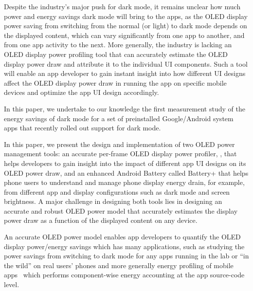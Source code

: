 Despite the industry's major push for dark mode, it remains unclear
how much power and energy savings dark mode will bring to the apps, as
the OLED display power saving from switching from the normal (or
light) to dark mode depends on the displayed content, which can vary
significantly from one app to another, and from one app activity to
the next. More generally, the industry is lacking an OLED display
power profiling tool that can accurately estimate the OLED display
power draw and attribute it to the individual UI components.  Such a
tool will enable an app developer to gain instant insight into how different
UI designs affect the OLED display power draw in running the app on
specific mobile devices and optimize the app UI design accordingly.

In this paper, we undertake to our knowledge the first measurement
study of the energy savings of dark mode for a set of preinstalled Google/Android system
apps that recently rolled out support for dark mode.
\fi

In this paper, we present the design and implementation
of two OLED power management tools:
an accurate per-frame OLED display power profiler, \namee, that helps
developers to gain insight into the impact of different app UI designs
on its OLED power draw, and an enhanced Android Battery called Battery+ that
helps phone users to understand and manage phone
display energy drain, for example, from different app and display
configurations such as dark mode and screen brightness. A major challenge in
designing both tools lies
in designing an accurate and robust
OLED power model that accurately estimates the display power draw
as a function of the displayed content on any device.

An accurate OLED power model enables app developers to
quantify the OLED display power/energy savings which has many
applications, such as studying the power savings from switching to
dark mode for any apps running in the lab or ``in the wild'' on real
users' phones
and more generally energy profiling of mobile
apps~\cite{appscope,zhang2010accurate,shye2009into,pathak:eurosys12,mittal:mobicom12,androidprofiler}
which performs component-wise energy accounting at the app source-code
level.
\fi


